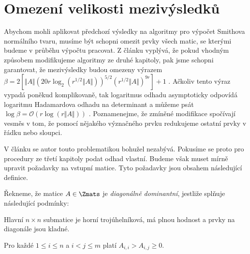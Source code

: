 \section{Omezení velikosti mezivýsledků}
Abychom mohli aplikovat předchozí výsledky na algoritmy pro výpočet Smithova
normálního tvaru, musíme být schopni omezit prvky všech matic, se kterými
budeme v průběhu výpočtu pracovat. Z článku \cite{triang} vyplývá, že pokud
vhodným způsobem modifikujeme algoritmy ze druhé kapitoly, pak jsme schopni
garantovat, že mezivýsledky budou omezeny výrazem
$ \beta = 2[\Vert A \Vert (20 r \log_2{ (r^{1/2} \Vert A \Vert) })^{5/2} (r^{1/2} \Vert A \Vert)^{9 r} ] + 1 $
\cite[Theorem 16]{triang}.
Ačkoliv tento výraz vypadá poněkud komplikovaně, tak logaritmus odhadu
asymptoticky odpovídá logaritmu Hadamardova odhadu na determinant a můžeme psát
$ \log{\beta} = \mathcal{O}(r \log{(r \Vert A \Vert)}) $ \cite[Theorem 16]{triang}.
Poznamenejme, že zmíněné modifikace spočívají vesměs v tom, že pomocí nějakého
význačného prvku redukujeme ostatní prvky v řádku nebo sloupci.

V článku \cite{SNF_Arne} se autor touto problematikou bohužel nezabývá. Pokusíme
se proto pro procedury ze třetí kapitoly podat odhad vlastní. Budeme však muset
mírně upravit požadavky na vstupní matice. Tyto požadavky jsou obsahem následující
definice.

\begin{defi}
    Řekneme, že matice $ A \in \Zmats $ je \emph{diagonálně dominantní}, jestliže
    splňuje následující podmínky:
    \begin{Cond}
        \item Hlavní $ n \times n $ submatice je horní trojúhelníková, má plnou
            hodnost a prvky na diagonále jsou kladné.
        \item Pro každé $ 1 \leq i \leq n $ a $ i < j \leq m $ platí 
            $ A_{i, i} > A_{i, j} \geq 0 $.
    \end{Cond}
\end{defi}

